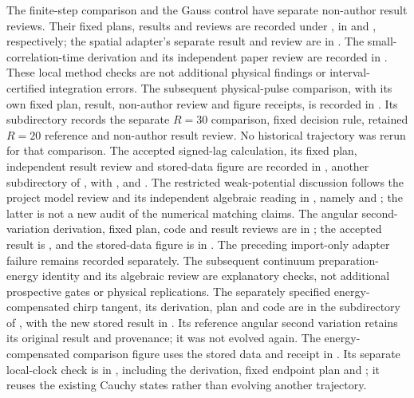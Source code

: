 The finite-step comparison and the Gauss control have separate non-author
result reviews. Their fixed plans, results and reviews are recorded under
,
in  and , respectively; the spatial
adapter's separate result and review are in .
The small-correlation-time derivation and its independent paper review are
recorded in . These local method checks are not
additional physical findings or interval-certified integration errors.
The subsequent physical-pulse comparison, with its own fixed plan, result,
non-author review and figure receipts, is recorded in
.
Its  subdirectory records the separate $R=30$
comparison, fixed decision rule, retained $R=20$ reference and non-author
result review. No historical trajectory was rerun for that comparison.
The accepted signed-lag calculation, its fixed plan, independent result
review and stored-data figure are recorded in ,
another subdirectory of , with
,  and .
The restricted weak-potential discussion follows the project model review
and its independent algebraic reading in
, namely
 and ; the latter
is not a new audit of the numerical matching claims.
The angular second-variation derivation, fixed plan, code and result reviews
are in ;
the accepted result is , and the
stored-data figure is in . The preceding import-only
adapter failure remains recorded separately. The subsequent continuum
preparation-energy identity and its algebraic review are explanatory
checks, not additional prospective gates or physical replications.
The separately specified energy-compensated chirp tangent, its derivation,
plan and code are in the  subdirectory of
, with the new stored result in
. Its reference angular second variation
retains its original result and provenance; it was not evolved again.
The energy-compensated comparison figure uses the stored data and receipt
in . Its separate local-clock check is in
, including the derivation, fixed endpoint
plan and ; it reuses the existing Cauchy
states rather than evolving another trajectory.
